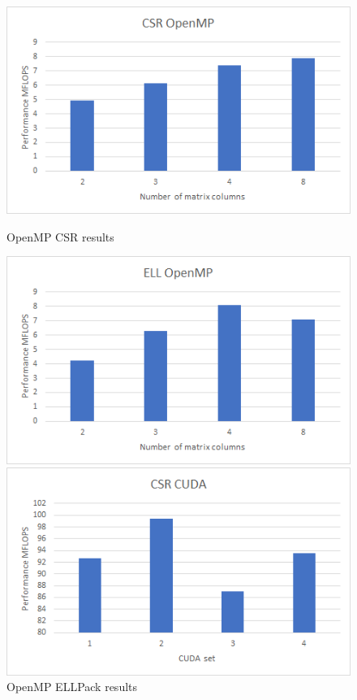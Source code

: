 \documentclass{scrreprt}
\begin{document}
\begin{figure}[ht] 
  \label{ fig7} 
  \begin{minipage}[b]{0.5\linewidth}
    \centering
    \includegraphics[width=.9\linewidth]{cavity10CSRMP.png} 
    \caption{OpenMP CSR results} 
    \vspace{4ex}
  \end{minipage}%
  \begin{minipage}[b]{0.5\linewidth}
    \centering
    \includegraphics[width=.9\linewidth]{cavity10ELLMP.png} 
    \caption{OpenMP ELLPack results} 
    \vspace{4ex}
  \end{minipage} 
  \begin{minipage}[b]{0.5\linewidth}
    \centering
    \includegraphics[width=.9\linewidth]{cavity10CSRCUDA.png} 

\end{minipage}
\end{figure}
\end{document}

